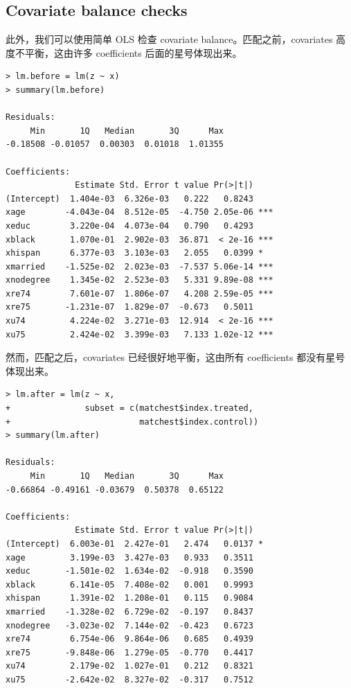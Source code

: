    
   
   \subsection{Covariate balance checks}
   
此外，我们可以使用简单 OLS 检查 covariate balance。匹配之前，covariates 高度不平衡，这由许多 coefficients 后面的星号体现出来。
  \begin{lstlisting}
> lm.before = lm(z ~ x)
> summary(lm.before) 

Residuals:
     Min       1Q   Median       3Q      Max 
-0.18508 -0.01057  0.00303  0.01018  1.01355 

Coefficients:
              Estimate Std. Error t value Pr(>|t|)    
(Intercept)  1.404e-03  6.326e-03   0.222   0.8243    
xage        -4.043e-04  8.512e-05  -4.750 2.05e-06 ***
xeduc        3.220e-04  4.073e-04   0.790   0.4293    
xblack       1.070e-01  2.902e-03  36.871  < 2e-16 ***
xhispan      6.377e-03  3.103e-03   2.055   0.0399 *  
xmarried    -1.525e-02  2.023e-03  -7.537 5.06e-14 ***
xnodegree    1.345e-02  2.523e-03   5.331 9.89e-08 ***
xre74        7.601e-07  1.806e-07   4.208 2.59e-05 ***
xre75       -1.231e-07  1.829e-07  -0.673   0.5011    
xu74         4.224e-02  3.271e-03  12.914  < 2e-16 ***
xu75         2.424e-02  3.399e-03   7.133 1.02e-12 *** 
      \end{lstlisting} 
      
      
      然而，匹配之后，covariates 已经很好地平衡，这由所有 coefficients 都没有星号体现出来。
      
      
   \begin{lstlisting}
> lm.after = lm(z ~ x, 
+               subset = c(matchest$index.treated, 
+                          matchest$index.control))
> summary(lm.after) 

Residuals:
     Min       1Q   Median       3Q      Max 
-0.66864 -0.49161 -0.03679  0.50378  0.65122 

Coefficients:
              Estimate Std. Error t value Pr(>|t|)  
(Intercept)  6.003e-01  2.427e-01   2.474   0.0137 *
xage         3.199e-03  3.427e-03   0.933   0.3511  
xeduc       -1.501e-02  1.634e-02  -0.918   0.3590  
xblack       6.141e-05  7.408e-02   0.001   0.9993  
xhispan      1.391e-02  1.208e-01   0.115   0.9084  
xmarried    -1.328e-02  6.729e-02  -0.197   0.8437  
xnodegree   -3.023e-02  7.144e-02  -0.423   0.6723  
xre74        6.754e-06  9.864e-06   0.685   0.4939  
xre75       -9.848e-06  1.279e-05  -0.770   0.4417  
xu74         2.179e-02  1.027e-01   0.212   0.8321  
xu75        -2.642e-02  8.327e-02  -0.317   0.7512
         \end{lstlisting} 
         
